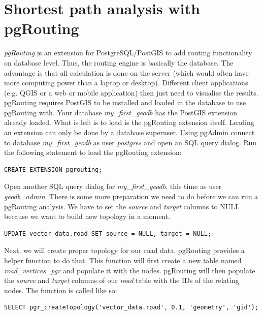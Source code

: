 \documentclass[a4paper,12pt,titlepage]{article}
\begin{document}
\section{Shortest path analysis with pgRouting}

\textit{pgRouting} is an extension for PostgreSQL/PostGIS to add routing functionality on database level. Thus, the routing engine is basically the database. The advantage is that all calculation is done on the server (which would often have more computing power than a laptop or desktop). Different client applications (e.g. QGIS or a web or mobile application) then just need to visualise the results. pgRouting requires PostGIS to be installed and loaded in the database to use pgRouting with. Your database \textit{my\_first\_geodb} has the PostGIS extension already loaded. What is left is to load is the pgRouting extension itself. Loading an extension can only be done by a database superuser. Using pgAdmin connect to database \textit{my\_first\_geodb} as user \textit{postgres} and open an SQL query dialog. Run the following statement to load the pgRouting extension:

\begin{lstlisting}[caption={Loading pgRouting extension}]
CREATE EXTENSION pgrouting; 
\end{lstlisting}

Open another SQL query dialog for \textit{my\_first\_geodb}, this time as user \textit{geodb\_admin}. There is some more preparation we need to do before we can run a pgRouting analysis. We have to set the \textit{source} and \textit{target} columns to NULL because we want to build new topology in a moment.

\begin{lstlisting}[caption={Setting columns to NULL}]
UPDATE vector_data.road SET source = NULL, target = NULL;
\end{lstlisting}

Next, we will create proper topology for our road data. pgRouting provides a helper function to do that. This function will first create a new table named \textit{road\_vertices\_pgr} and populate it with the nodes. pgRouting will then populate the \textit{source} and \textit{target} columns of our \textit{road} table with the IDs of the relating nodes. The function is called like so:

\begin{lstlisting}[caption={Building topology for the road data}]
SELECT pgr_createTopology('vector_data.road', 0.1, 'geometry', 'gid');
\end{lstlisting}
\end{document}
